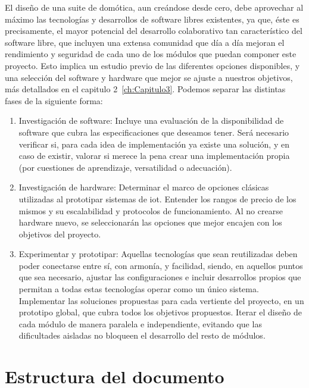 El diseño de una suite de domótica, aun creándose desde cero, debe aprovechar al máximo las tecnologías y desarrollos de software libres existentes, ya que, éste es precisamente, el mayor potencial del desarrollo colaborativo tan característico del software libre, que incluyen una extensa comunidad que día a día mejoran el rendimiento y seguridad de cada uno de los módulos que puedan componer este proyecto. Esto implica un estudio previo de las diferentes opciones disponibles, y una selección del software y hardware que mejor se ajuste a nuestros objetivos, más detallados en el capitulo 2~\ref{ch:Capitulo3}. Podemos separar las distintas fases de la siguiente forma:

\begin{enumerate}
  \item Investigación de software: Incluye una evaluación de la disponibilidad de software que cubra las especificaciones que deseamos tener. Será necesario verificar si, para cada idea de implementación ya existe una solución, y en caso de existir, valorar si merece la pena crear una implementación propia (por cuestiones de aprendizaje, versatilidad o adecuación).

  \item Investigación de hardware: Determinar el marco de opciones clásicas utilizadas al prototipar sistemas de \gls{iot}. Entender los rangos de precio de los mismos y su escalabilidad y protocolos de funcionamiento. Al no crearse hardware nuevo, se seleccionarán las opciones que mejor encajen con los objetivos del proyecto.

  \item Experimentar y prototipar: Aquellas tecnologías que sean reutilizadas deben poder conectarse entre sí, con armonía, y facilidad, siendo, en aquellos puntos que sea necesario, ajustar las configuraciones e incluir desarrollos propios que permitan a todas estas tecnologías operar como un único sistema. Implementar las soluciones propuestas para cada vertiente del proyecto, en un prototipo global, que cubra todos los objetivos propuestos. Iterar el diseño de cada módulo de manera paralela e independiente, evitando que las dificultades aisladas no bloqueen el desarrollo del resto de módulos.

\end{enumerate}

\section{Estructura del documento}
\label{ch:Capitulo1.3}

